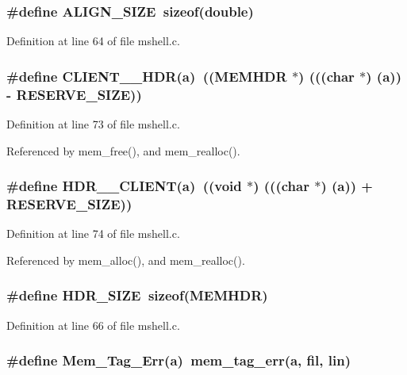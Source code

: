 \subsubsection{\setlength{\rightskip}{0pt plus 5cm}\#define ALIGN\_\-SIZE\ sizeof(double)}\label{mshell_8c_a2}




Definition at line 64 of file mshell.c.
\subsubsection{\setlength{\rightskip}{0pt plus 5cm}\#define CLIENT\_\_\-HDR(a)\ (({\bf MEMHDR} $\ast$)  (((char $\ast$) (a)) - RESERVE\_\-SIZE))}\label{mshell_8c_a5}




Definition at line 73 of file mshell.c.

Referenced by mem\_\-free(), and mem\_\-realloc().
\subsubsection{\setlength{\rightskip}{0pt plus 5cm}\#define HDR\_\_\-CLIENT(a)\ ((void $\ast$)  (((char $\ast$) (a)) + RESERVE\_\-SIZE))}\label{mshell_8c_a6}




Definition at line 74 of file mshell.c.

Referenced by mem\_\-alloc(), and mem\_\-realloc().
\subsubsection{\setlength{\rightskip}{0pt plus 5cm}\#define HDR\_\-SIZE\ sizeof({\bf MEMHDR})}\label{mshell_8c_a3}




Definition at line 66 of file mshell.c.
\subsubsection{\setlength{\rightskip}{0pt plus 5cm}\#define Mem\_\-Tag\_\-Err(a)\ mem\_\-tag\_\-err(a, fil, lin)}\label{mshell_8c_a7}




